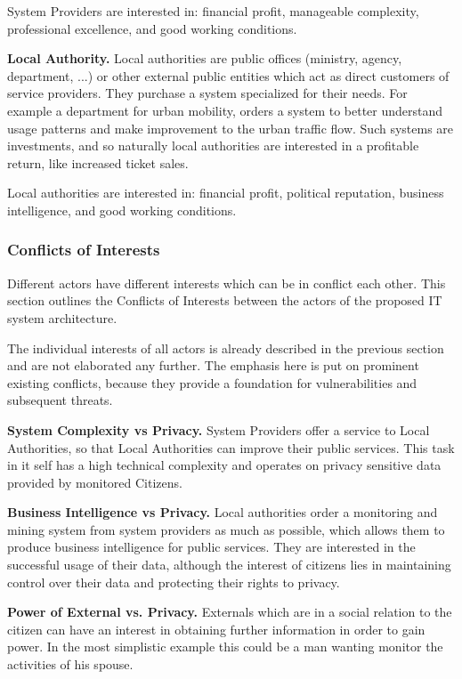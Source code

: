 \documentclass[runningheads,a4paper]{llncs}
\begin{document}
System Providers are interested in: financial profit, manageable complexity, professional excellence, and good working conditions.

\textbf{Local Authority.}
Local authorities are public offices (ministry, agency, department, ...) or other external public entities which act as direct customers of service providers.
They purchase a system specialized for their needs.
For example a department for urban mobility, orders a system to better understand usage patterns and make improvement to the urban traffic flow. Such systems are investments, and so naturally local authorities are interested in a profitable return, like increased ticket sales.

Local authorities are interested in: financial profit, political reputation, business intelligence, and good working conditions.


\subsubsection{Conflicts of Interests}
\label{subsubsection:Conflicts of Interests}
Different actors have different interests which can be in conflict each other. This section outlines the Conflicts of Interests between the actors of the proposed IT system architecture.

The individual interests of all actors is already described in the previous section and are not elaborated any further.
The emphasis here is put on prominent existing conflicts, because they provide a foundation for vulnerabilities and subsequent threats.


\textbf{System Complexity vs Privacy.}
System Providers offer a service to Local Authorities, so that Local Authorities can improve their public services. This task in it self has a high technical complexity and operates on privacy sensitive data provided by monitored Citizens.

\textbf{Business Intelligence vs Privacy.}
Local authorities order a monitoring and mining system from system providers as much as possible, which allows them to produce business intelligence for public services. They are interested in the successful usage of their data, although the interest of citizens lies in maintaining control over their data and protecting their rights to privacy.

\textbf{Power of External vs. Privacy.}
Externals which are in a social relation to the citizen can have an interest in obtaining further information in order to gain power. In the most simplistic example this could be a man wanting monitor the activities of his spouse.
\end{document}

